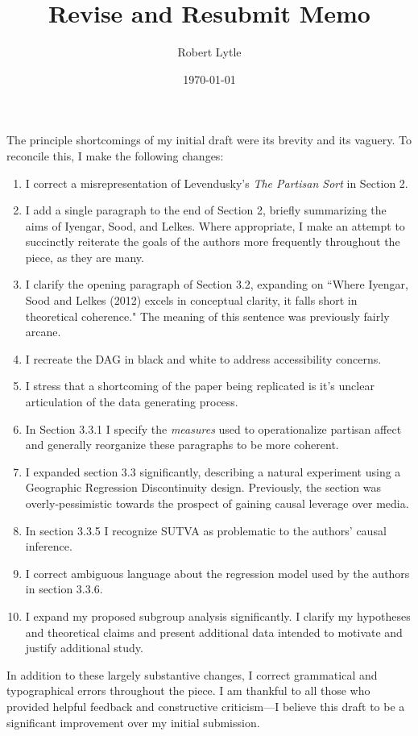 \documentclass[12pt]{article}
\begin{document}
\title{Revise and Resubmit Memo}
\author{Robert Lytle}
\date{\today}
\maketitle

\noindent The principle shortcomings of my initial draft were its brevity and its vaguery. To reconcile this, I make the following changes:
\begin{enumerate}
\item I correct a misrepresentation of Levendusky's \textit{The Partisan Sort} in Section 2.
\item I add a single paragraph to the end of Section 2, briefly summarizing the aims of Iyengar, Sood, and Lelkes. Where appropriate, I make an attempt to succinctly reiterate the goals of the authors more frequently throughout the piece, as they are many.
\item I clarify the opening paragraph of Section 3.2, expanding on ``Where Iyengar, Sood and Lelkes (2012) excels in conceptual clarity, it falls short in theoretical coherence." The meaning of this sentence was previously fairly arcane.
\item I recreate the DAG in black and white to address accessibility concerns.
\item I stress that a shortcoming of the paper being replicated is it's unclear articulation of the data generating process.
\item In Section 3.3.1 I specify the \textit{measures} used to operationalize partisan affect and generally reorganize these paragraphs to be more coherent.
\item I expanded section 3.3 significantly, describing a natural experiment using a Geographic Regression Discontinuity design. Previously, the section was overly-pessimistic towards the prospect of gaining causal leverage over media.
\item In section 3.3.5 I recognize SUTVA as problematic to the authors' causal inference.
\item I correct ambiguous language about the regression model used by the authors in section 3.3.6.
\item I expand my proposed subgroup analysis significantly. I clarify my hypotheses and theoretical claims and present additional data intended to motivate and justify additional study.
\end{enumerate}
In addition to these largely substantive changes, I correct grammatical and typographical errors throughout the piece. I am thankful to all those who provided helpful feedback and constructive criticism---I believe this draft to be a significant improvement over my initial submission.


\thispagestyle{empty}
\clearpage
%
\end{document}
